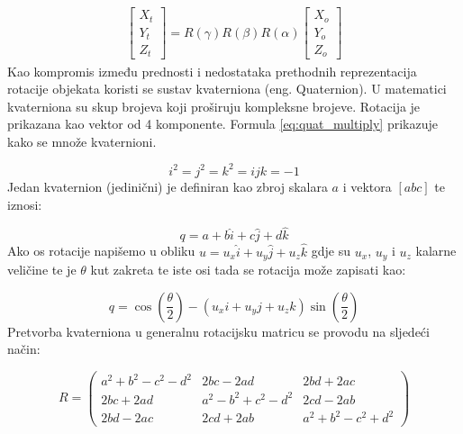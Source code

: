 \begin{gather}
    \begin{bmatrix} X_{t}\\ Y_{t}\\ Z_{t} \end{bmatrix}
    =
    R(\gamma)R(\beta)R(\alpha)
    \begin{bmatrix} X_{o}\\ Y_{o}\\ Z_{o} \end{bmatrix}
    \label{eq:rotate_point}
\end{gather}
Kao kompromis između prednosti i nedostataka prethodnih reprezentacija rotacije objekata koristi se sustav kvaterniona\cite{wiki:Quaternion} (eng. Quaternion). U matematici kvaterniona su skup brojeva koji proširuju kompleksne brojeve. Rotacija je prikazana kao vektor od 4 komponente. Formula \ref{eq:quat_multiply} prikazuje kako se množe kvaternioni.

\begin{equation}
  i^2 = j^2 = k^2 = ijk = -1
  \label{eq:quat_multiply}
\end{equation}
Jedan kvaternion (jedinični) je definiran kao zbroj skalara $a$ i vektora $[a b c]$ te iznosi:

\begin{equation}
  q = a + b\hat{i} + c\hat{j} + d\hat{k}
  \label{eq:jedinicni_vektor}
\end{equation}
Ako os rotacije napišemo u obliku $u=u_{x}\hat{i} + u_{y}\hat{j} + u_{z}\hat{k}$ gdje su $u_{x}$, $u_{y}$ i $u_{z}$ kalarne veličine te je $\theta$ kut zakreta te iste osi tada se rotacija može zapisati kao:

\begin{equation}
  q=\cos(\frac{\theta}{2})-(u_{x}i + u_{y}j + u_{z}k)\sin(\frac{\theta}{2})
\end{equation}
Pretvorba kvaterniona u generalnu rotacijsku matricu se provodu na sljedeći način:

\begin{equation}
R = 
  \begin{pmatrix}
    a^2 + b^2 - c^2 - d^2 & 2bc - 2ad & 2bd + 2ac \\
    2bc + 2ad & a^2 - b^2 + c^2 - d^2 & 2cd - 2ab \\
    2bd - 2ac & 2cd + 2ab & a^2 + b^2 - c^2 + d^2
  \end{pmatrix}
  \label{eq:qvat_to_rot_mat}
\end{equation}